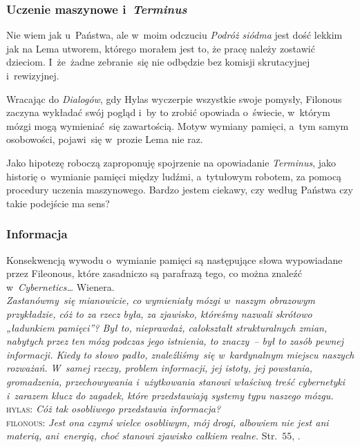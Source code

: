 \documentclass[10pt,t]{beamer}
\begin{document}
\begin{frame}
  \frametitle{Uczenie maszynowe i~\textit{Terminus}}


  Nie wiem jak u~Państwa, ale w~moim odczuciu \textit{Podróż siódma} jest
  dość lekkim jak na Lema utworem, którego morałem jest to, że pracę należy
  zostawić dzieciom. I~że~żadne zebranie~się nie odbędzie bez komisji
  skrutacyjnej i~rewizyjnej.

  Wracając do \textit{Dialogów}, gdy Hylas wyczerpie wszystkie swoje
  pomysły, Filonous zaczyna wykładać swój pogląd i~by to zrobić
  opowiada o~świecie, w~którym mózgi mogą wymieniać~się zawartością. Motyw
  wymiany pamięci, a~tym samym osobowości, pojawi~się w~prozie Lema nie raz.

  Jako hipotezę roboczą zaproponuję spojrzenie na opowiadanie
  \textit{Terminus}, jako historię o~wymianie pamięci między ludźmi,
  a~tytułowym robotem, za pomocą procedury uczenia maszynowego. Bardzo
  jestem ciekawy, czy według Państwa czy takie podejście ma sens?

\end{frame}





\begin{frame}
  \frametitle{Informacja}


  Konsekwencją wywodu o~wymianie pamięci są następujące słowa wypowiadane
  przez Fileonous, które zasadniczo są parafrazą tego, co można znaleźć
  w~\textit{Cybernetics\ldots} Wienera. \\
  \textit{Zastanówmy~się mianowicie, co wymieniały mózgi w~naszym obrazowym
    przykładzie, cóż to za rzecz była, za zjawisko, któreśmy nazwali
    skrótowo „ładunkiem pamięci”? Był to, nieprawdaż, całokształt
    strukturalnych zmian, nabytych przez ten mózg podczas jego istnienia,
    to znaczy~-- był to zasób pewnej informacji. Kiedy to słowo padło,
    znaleźliśmy~się w~kardynalnym miejscu naszych rozważań. W~samej rzeczy,
    problem informacji, jej istoty, jej powstania, gromadzenia,
    przechowywania i~użytkowania stanowi właściwą treść cybernetyki
    i~zarazem klucz do zagadek, które przedstawiają systemy typu naszego
    mózgu.} \\
  \textsc{hylas}: \textit{Cóż tak osobliwego przedstawia informacja?} \\
  \textsc{filonous}: \textit{Jest ona czymś wielce osobliwym, mój drogi,
    albowiem nie jest ani materią, ani~energią, choć stanowi zjawisko
    całkiem realne.} Str.~$55$, \parencite{Lem-Dialogi-Vol-I-Pub-1996}.

\end{frame}
\end{document}
